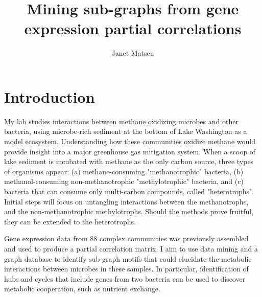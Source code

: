 \documentclass[12pt]{article}
\begin{document}
 
\title{Mining sub-graphs from gene expression partial correlations}
\author{Janet Matsen}
\maketitle

\section{Introduction} %

My lab studies interactions between methane oxidizing microbes and other bacteria, using microbe-rich sediment at the bottom of Lake Washington as a model ecosystem.  
Understanding how these communities oxidize methane would provide insight into a major greenhouse gas mitigation system. 
When a scoop of lake sediment is incubated with methane as the only carbon source, three types of organisms appear: 
(a) methane-consuming "methanotrophic" bacteria, 
(b) methanol-consuming non-methanotrophic "methylotrophic" bacteria, and 
(c) bacteria that can consume only multi-carbon compounds, called "heterotrophs".
Initial steps will focus on untangling interactions between the methanotrophs, and the non-methanotrophic methylotrophs.
Should the methods prove fruitful, they can be extended to the heterotrophs. 


Gene expression data from 88 complex communities was previously assembled and used to produce a partial correlation matrix.
I aim to use data mining and a graph database to identify sub-graph motifs that could elucidate the metabolic interactions between microbes in these samples.
In particular, identification of hubs and cycles that include genes from two bacteria can be used to discover metabolic cooperation, such as nutrient exchange. 

\end{document}
